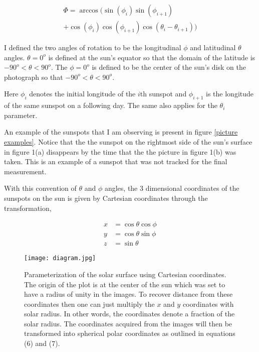\documentclass[aps,twocolumn,showpacs,preprintnumbers]{revtex4}
\begin{document}
\begin{multline}
    \Phi = \arccos(\sin{(\phi_i)}\sin{(\phi_{i+1})}\\
    + \cos{(\phi_i)}\cos{(\phi_{i+1})}\cos{(\theta_i-\theta_{i+1})}) 
\end{multline}

I defined the two angles of rotation to be the longitudinal $\phi$ and latitudinal $\theta$ angles. $\theta=0^o$ is defined at the sun's equator so that the domain of the latitude is $-90^o<\theta<90^o$. The $\phi=0^o$ is defined to be the center of the sun's disk on the photograph so that $-90^o<\theta<90^o$. 

Here $\phi_i$ denotes the initial longitude of the $i$th sunspot and $\phi_{i+1}$ is the longitude of the same sunspot on a following day. The same also applies for the $\theta_i$ parameter. 

An example of the sunspots that I am observing is present in figure \ref{picture examples}. Notice that the the sunspot on the rightmost side of the sun's surface in figure 1(a) disappears by the time that the the picture in figure 1(b) was taken. This is an example of a sunspot that was not tracked for the final measurement. 

With this convention of $\theta$ and $\phi$ angles, the 3 dimensional coordinates of the sunspots on the sun is given by Cartesian coordinates through the transformation,

\begin{align}
    x &= \cos{\theta}\cos{\phi}\\
    y &= \cos{\theta}\sin{\phi}\\
    z &= \sin{\theta}
\end{align}



\begin{figure}[h]
%
\texttt{[image: diagram.jpg]}
%
\caption{\label{diagram} 
Parameterization of the solar surface using Cartesian coordinates. The origin of the plot is at the center of the sun which was set to have a radius of unity in the images. To recover distance from these coordinates then one can just multiply the $x$ and $y$ coordinates with solar radius. In other words, the coordinates denote a fraction of the solar radius. The coordinates acquired from the images will then be transformed into spherical polar coordinates as outlined in equations (6) and (7).}
%
\end{figure}
\end{document}
